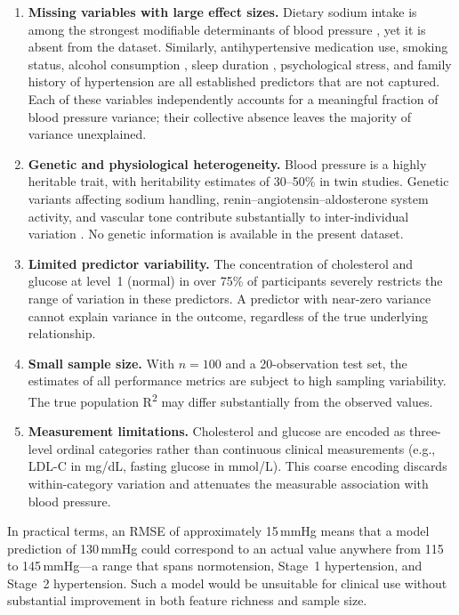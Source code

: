 ﻿\documentclass[conference]{IEEEtran}
\begin{document}
\begin{enumerate}
  \item \textbf{Missing variables with large effect sizes.} Dietary sodium intake is among the strongest modifiable determinants of blood pressure \cite{bmj2009}, yet it is absent from the dataset. Similarly, antihypertensive medication use, smoking status, alcohol consumption \cite{alcohol2021}, sleep duration \cite{sleep2010}, psychological stress, and family history of hypertension are all established predictors that are not captured. Each of these variables independently accounts for a meaningful fraction of blood pressure variance; their collective absence leaves the majority of variance unexplained.

  \item \textbf{Genetic and physiological heterogeneity.} Blood pressure is a highly heritable trait, with heritability estimates of 30--50\% in twin studies. Genetic variants affecting sodium handling, renin--angiotensin--aldosterone system activity, and vascular tone contribute substantially to inter-individual variation \cite{abrahamowicz2023}. No genetic information is available in the present dataset.

  \item \textbf{Limited predictor variability.} The concentration of cholesterol and glucose at level~1 (normal) in over 75\% of participants severely restricts the range of variation in these predictors. A predictor with near-zero variance cannot explain variance in the outcome, regardless of the true underlying relationship.

  \item \textbf{Small sample size.} With $n=100$ and a 20-observation test set, the estimates of all performance metrics are subject to high sampling variability. The true population R\textsuperscript{2} may differ substantially from the observed values.

  \item \textbf{Measurement limitations.} Cholesterol and glucose are encoded as three-level ordinal categories rather than continuous clinical measurements (e.g., LDL-C in mg/dL, fasting glucose in mmol/L). This coarse encoding discards within-category variation and attenuates the measurable association with blood pressure.
\end{enumerate}

In practical terms, an RMSE of approximately 15\,mmHg means that a model prediction of 130\,mmHg could correspond to an actual value anywhere from 115 to 145\,mmHg---a range that spans normotension, Stage~1 hypertension, and Stage~2 hypertension. Such a model would be unsuitable for clinical use without substantial improvement in both feature richness and sample size.
\end{document}
